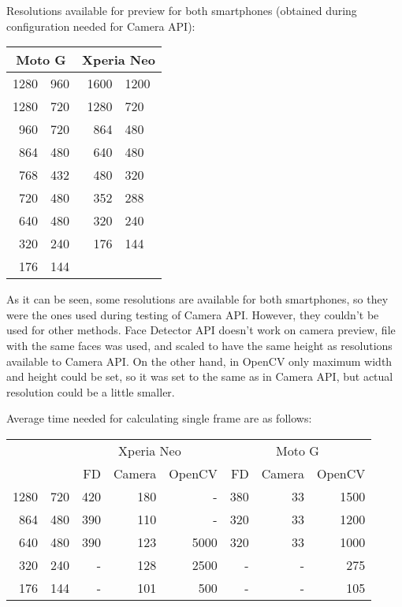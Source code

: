 Resolutions available for preview for both smartphones (obtained during
configuration needed for Camera API):
\begin{center}
\begin{tabular}{r@{ x }l|r@{ x }l}
\multicolumn{2}{c|}{Moto G} & \multicolumn{2}{c}{Xperia Neo} \\
\hline
1280 & 960 & 1600 & 1200 \\
1280 & 720 & 1280 & 720 \\
960 & 720 & 864 & 480 \\
864 & 480 & 640 & 480 \\
768 & 432 & 480 & 320 \\
720 & 480 & 352 & 288 \\
640 & 480 & 320 & 240 \\
320 & 240 & 176 & 144 \\
176 & 144 \\
\end{tabular}
\end{center}
As it can be seen, some resolutions are available for both smartphones, so they
were the ones used during testing of Camera API. 
However, they couldn't be used for other methods.
Face Detector API doesn't work on camera preview, file with the same faces was
used, and scaled to have the same height as resolutions available to Camera API. 
On the other hand, in OpenCV only maximum width and height could be set, so it
was set to the same as in Camera API, but actual resolution could be a little
smaller.

Average time needed for calculating single frame are as follows:
\begin{center}
\begin{tabular}{r@{ x }l|r|r|r|r|r|r}
\multicolumn{2}{c|}{} & \multicolumn{3}{c|}{Xperia Neo} &
\multicolumn{3}{c}{Moto G}
\\
\multicolumn{2}{c|}{} & \hspace{4ex}FD & Camera & OpenCV & \hspace{4ex}FD &
Camera & OpenCV
\\
\hline 1280 & 720 & 420 & 180 & - & 380 & 33 & 1500 \\
864 & 480 & 390 & 110 & - & 320 & 33 & 1200 \\
640 & 480 & 390 & 123 & 5000 & 320 & 33 & 1000 \\
320 & 240 & - & 128 & 2500 & - & - & 275 \\
176 & 144 & - & 101 & 500 & - & - & 105
\end{tabular}
\end{center}
